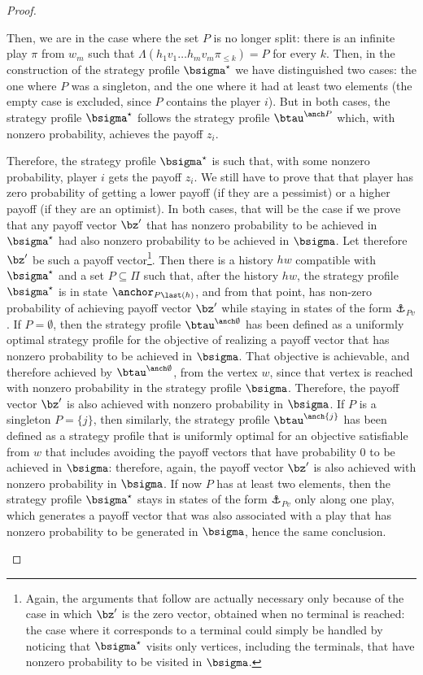 \begin{proof}
\begin{claimproof}
    Then, we are in the case where the set $P$ is no longer split: there is an infinite play $\pi$ from $w_m$ such that $\Lambda(h_1 v_1 \dots h_m v_m \pi_{\leq k}) = P$ for every $k$.
    Then, in the construction of the strategy profile $\bsigma^\star$ we have distinguished two cases: the one where $P$ was a singleton, and the one where it had at least two elements (the empty case is excluded, since $P$ contains the player $i$).
    But in both cases, the strategy profile $\bsigma^\star$ follows the strategy profile $\btau^{\anch P}$ which, with nonzero probability, achieves the payoff $z_i$.
    
    Therefore, the strategy profile $\bsigma^\star$ is such that, with some nonzero probability, player $i$ gets the payoff $z_i$.
    We still have to prove that that player has zero probability of getting a lower payoff (if they are a pessimist) or a higher payoff (if they are an optimist).
    In both cases, that will be the case if we prove that any payoff vector $\bz'$ that has nonzero probability to be achieved in $\bsigma^\star$ had also nonzero probability to be achieved in $\bsigma$.
    Let therefore $\bz'$ be such a payoff vector\footnote{Again, the arguments that follow are actually necessary only because of the case in which $\bz'$ is the zero vector, obtained when no terminal is reached: the case where it corresponds to a terminal could simply be handled by noticing that $\bsigma^\star$ visits only vertices, including the terminals, that have nonzero probability to be visited in $\bsigma$.}.
    Then there is a history $hw$ compatible with $\bsigma^\star$ and a set $P \subseteq \Pi$ such that, after the history $hw$, the strategy profile $\bsigma^\star$ is in state $\anchor_{P \last(h)}$, and from that point, has non-zero probability of achieving payoff vector $\bz'$ while staying in states of the form $\anchor_{P v}$.
    If $P = \emptyset$, then the strategy profile $\btau^{\anch \emptyset}$ has been defined as a uniformly optimal strategy profile for the objective of realizing a payoff vector that has nonzero probability to be achieved in $\bsigma$.
    That objective is achievable, and therefore achieved by $\btau^{\anch \emptyset}$, from the vertex $w$, since that vertex is reached with nonzero probability in the strategy profile $\bsigma$.
    Therefore, the payoff vector $\bz'$ is also achieved with nonzero probability in $\bsigma$.
    If $P$ is a singleton $P = \{j\}$, then similarly, the strategy profile $\btau^{\anch \{j\}}$ has been defined as a strategy profile that is uniformly optimal for an objective satisfiable from $w$ that includes avoiding the payoff vectors that have probability $0$ to be achieved in $\bsigma$: therefore, again, the payoff vector $\bz'$ is also achieved with nonzero probability in $\bsigma$.
    If now $P$ has at least two elements, then the strategy profile $\bsigma^\star$ stays in states of the form $\anchor_{P v}$ only along one play, which generates a payoff vector that was also associated with a play that has nonzero probability to be generated in $\bsigma$, hence the same conclusion.
\end{claimproof}


\end{proof}
